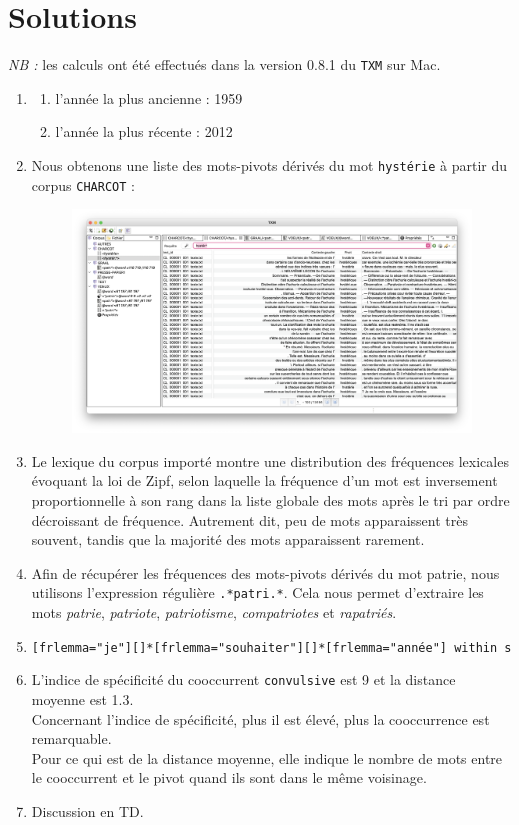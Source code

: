 \documentclass[xcolor={table,usenames,dvipsnames}]{article}
\begin{document}
\section{Solutions}
\textit{NB :} les calculs ont été effectués dans la version \textsc{0.8.1} du \texttt{TXM} sur Mac.
\begin{enumerate}
	\item
	\begin{enumerate}
		\item l'année la plus ancienne : 1959 
		\item l'année la plus récente : 2012
 	\end{enumerate}
 	
 	\item Nous obtenons une liste des mots-pivots dérivés du mot \texttt{hystérie} à partir du corpus \texttt{CHARCOT} :
 	\begin{figure}[h] %
 		\centering
 		\includegraphics[width=0.80\linewidth]{img/hysterie.png}
 		\label{fig:ling_out_TAL}
 	\end{figure}
 	
 	\item Le lexique du corpus importé montre une distribution des fréquences lexicales évoquant la loi de Zipf, selon laquelle la fréquence d'un mot est inversement proportionnelle à son rang dans la liste globale des mots après le tri par ordre décroissant de fréquence. Autrement dit, peu de mots apparaissent très souvent, tandis que la majorité des mots apparaissent rarement.
 	
 	\item Afin de récupérer les fréquences des mots-pivots dérivés du mot \og{}patrie\fg{}, nous utilisons l'expression régulière \texttt{.*patri.*}. Cela nous permet d'extraire les mots \textit{patrie}, \textit{patriote}, \textit{patriotisme}, \textit{compatriotes} et \textit{rapatriés}.
 	
 	\item \texttt{[frlemma="je"][]*[frlemma="souhaiter"][]*[frlemma="année"] within s}
 	\item L'indice de spécificité du cooccurrent \texttt{convulsive} est \textsc{9} et la distance moyenne est \textsc{1.3}.\\ Concernant l'indice de spécificité, plus il est élevé, plus
 	la cooccurrence est remarquable. \\
 	Pour ce qui est de la distance moyenne, elle indique le nombre de mots entre le cooccurrent et le pivot quand ils sont dans le même voisinage.
 	\item Discussion en \textsc{TD}.
 	

\end{enumerate}
\end{document}
